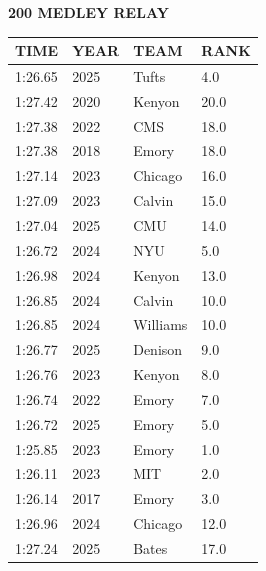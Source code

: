 \begin{table}[H]
\centering
\begin{minipage}[t]{0.6\textwidth}
\centering
\textbf{200 MEDLEY RELAY}\\[0.1cm]
\begin{tabular}{@{}p{1.8cm}p{1.2cm}p{1.4cm}p{0.8cm}@{}}
\hline
    \textbf{TIME} & \textbf{YEAR} & \textbf{TEAM} & \textbf{RANK} \\
\hline
    1:26.65 & 2025 & Tufts & 4.0 \\
    1:27.42 & 2020 & Kenyon & 20.0 \\
    1:27.38 & 2022 & CMS & 18.0 \\
    1:27.38 & 2018 & Emory & 18.0 \\
    1:27.14 & 2023 & Chicago & 16.0 \\
    1:27.09 & 2023 & Calvin & 15.0 \\
    1:27.04 & 2025 & CMU & 14.0 \\
    1:26.72 & 2024 & NYU & 5.0 \\
    1:26.98 & 2024 & Kenyon & 13.0 \\
    1:26.85 & 2024 & Calvin & 10.0 \\
    1:26.85 & 2024 & Williams & 10.0 \\
    1:26.77 & 2025 & Denison & 9.0 \\
    1:26.76 & 2023 & Kenyon & 8.0 \\
    1:26.74 & 2022 & Emory & 7.0 \\
    1:26.72 & 2025 & Emory & 5.0 \\
    1:25.85 & 2023 & Emory & 1.0 \\
    1:26.11 & 2023 & MIT & 2.0 \\
    1:26.14 & 2017 & Emory & 3.0 \\
    1:26.96 & 2024 & Chicago & 12.0 \\
    1:27.24 & 2025 & Bates & 17.0 \\
\hline
\end{tabular}
\end{minipage}
\end{table}

